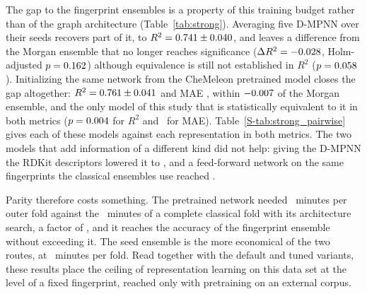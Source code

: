 The gap to the fingerprint ensembles is a property of this training budget rather than of the graph architecture
(Table~\ref{tab:strong}). Averaging five D-MPNN over their seeds recovers part of it, to $R^2 =
0.741 \pm 0.040$, and leaves a difference from the Morgan ensemble that no longer reaches
significance ($\Delta R^2 = -0.028$, Holm-adjusted $p = 0.162$) although
equivalence is still not established in $R^2$ ($p = 0.058$). Initializing the same network from
the CheMeleon pretrained model closes the gap altogether: $R^2 = 0.761 \pm 0.041$ and MAE
\ChemeleonMae, within $-0.007$ of the Morgan ensemble, and the only model of this study that is
statistically equivalent to it in both metrics ($p = 0.004$ for $R^2$ and
\ChemeleonVsMorganEquivPMae\ for MAE). Table~\ref{S-tab:strong_pairwise} gives each of these models against each representation in both metrics. The two models that add information of a different kind did not help: giving the
D-MPNN the RDKit descriptors lowered it to \DmpnnRdkitRTwoMean, and a feed-forward network on the same fingerprints the
classical ensembles use reached \MlpEcfpRTwoMean.

\begin{table}[htbp]
	\centering
	\caption{Neural models evaluated on the \TotalOuterFolds\ shared outer folds, ordered by $R^2$, with the Morgan ensemble and the default D-MPNN as references. $\Delta R^2$ is the difference from the Morgan ensemble, $p$ its Holm-adjusted value within the four classical representations, and $p_{\mathrm{equiv}}$ the two one-sided tests against the $\pm \EquivMarginRTwo$ margin. Times are the mean wall-clock time of one outer fold and are not normalized by thread count.}
	\label{tab:strong}
\end{table}

Parity therefore costs something. The pretrained network needed \ChemeleonFoldMinutes\ minutes per outer fold against
the \ClassicalMorganFoldMinutes\ minutes of a complete classical fold with its architecture search, a factor of
\ChemeleonCostFactor, and it reaches the accuracy of the fingerprint ensemble without exceeding it. The seed ensemble is the
more economical of the two routes, at \DmpnnEnsFoldMinutes\ minutes per fold. Read together with the default and tuned
variants, these results place the ceiling of representation learning on this data set at the level of a fixed
fingerprint, reached only with pretraining on an external corpus.

